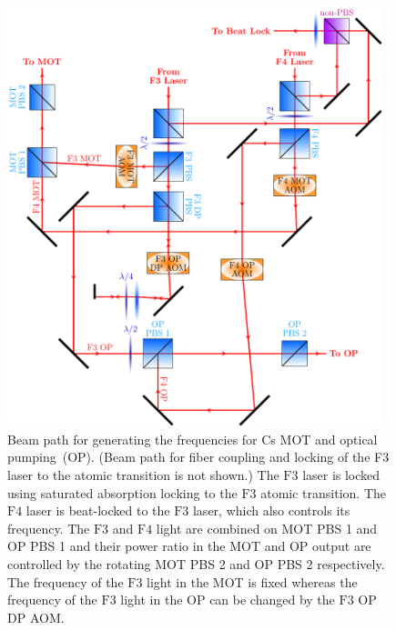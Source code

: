\begin{figure}
  \centering
  \includegraphics[width=0.971\textwidth]{figures/loading_cs_res_beampath.pdf}
  \caption[Beam path for Cs $\mathrm{D2}$ light]{
    Beam path for generating the frequencies for Cs MOT and optical pumping~(OP).
    (Beam path for fiber coupling and locking of the F3 laser
    to the atomic transition is not shown.)
    The $\mathrm{F3}$ laser is locked using saturated absorption locking
    to the $\mathrm{F3}$ atomic transition.
    The $\mathrm{F4}$ laser is beat-locked to the $\mathrm{F3}$ laser,
    which also controls its frequency.
    The $\mathrm{F3}$ and $\mathrm{F4}$ light are combined on MOT PBS 1 and OP PBS 1
    and their power ratio in the MOT and OP output are controlled by the
    rotating MOT PBS 2 and OP PBS 2 respectively.
    The frequency of the $\mathrm{F3}$ light in the MOT is fixed whereas
    the frequency of the $\mathrm{F3}$ light in the OP
    can be changed by the $\mathrm{F3}$ OP DP AOM.
    \label{fig:loading:free-space:cs-res-beampath}}
\end{figure}

